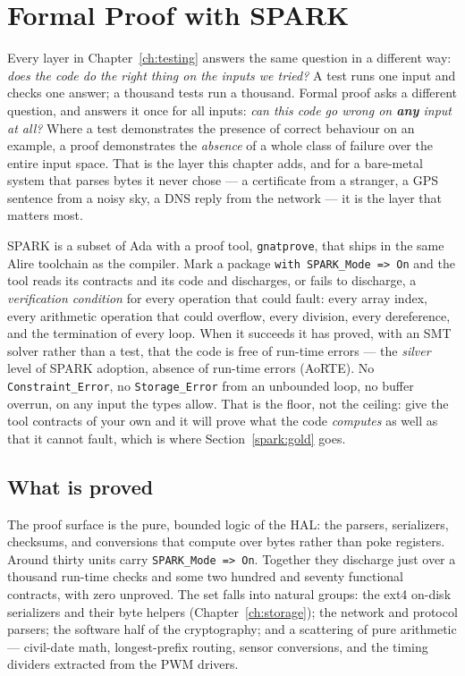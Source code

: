 \chapter{Formal Proof with SPARK}
\label{ch:spark}

Every layer in Chapter~\ref{ch:testing} answers the same question in a different
way: \emph{does the code do the right thing on the inputs we tried?} A test runs one
input and checks one answer; a thousand tests run a thousand. Formal proof asks a
different question, and answers it once for all inputs: \emph{can this code go wrong
on \textbf{any} input at all?} Where a test demonstrates the presence of correct
behaviour on an example, a proof demonstrates the \emph{absence} of a whole class of
failure over the entire input space. That is the layer this chapter adds, and for a
bare-metal system that parses bytes it never chose --- a certificate from a stranger,
a GPS sentence from a noisy sky, a DNS reply from the network --- it is the layer
that matters most.

SPARK is a subset of Ada with a proof tool, \texttt{gnatprove}, that ships in the
same Alire toolchain as the compiler. Mark a package \lstinline{with SPARK_Mode => On}
and the tool reads its contracts and its code and discharges, or fails to discharge,
a \emph{verification condition} for every operation that could fault: every array
index, every arithmetic operation that could overflow, every division, every
dereference, and the termination of every loop. When it succeeds it has proved, with
an SMT solver rather than a test, that the code is free of run-time errors --- the
\emph{silver} level of SPARK adoption, absence of run-time errors (AoRTE).
No \lstinline{Constraint_Error}, no \lstinline{Storage_Error} from an unbounded loop,
no buffer overrun, on any input the types allow. That is the floor, not the ceiling:
give the tool contracts of your own and it will prove what the code \emph{computes} as
well as that it cannot fault, which is where Section~\ref{spark:gold} goes.

\section{What is proved}

The proof surface is the pure, bounded logic of the HAL: the parsers, serializers,
checksums, and conversions that compute over bytes rather than poke registers. Around
thirty units carry \lstinline{SPARK_Mode => On}. Together they discharge just over a
thousand run-time checks and some two hundred and seventy functional contracts, with
zero unproved. The set falls into natural groups: the
ext4 on-disk serializers and their byte helpers (Chapter~\ref{ch:storage}); the
network and protocol parsers; the software half of the cryptography; and a scattering
of pure arithmetic --- civil-date math, longest-prefix routing, sensor conversions,
and the timing dividers extracted from the PWM drivers.

